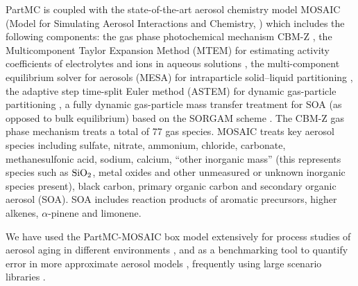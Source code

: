 \documentclass[11pt]{article}
\begin{document}
PartMC is coupled with the state-of-the-art aerosol chemistry model
MOSAIC (Model for Simulating Aerosol Interactions and Chemistry,
\citep{Zaveri2008}) which includes the following components: the gas
phase photochemical mechanism CBM-Z \citep{Zaveri1999}, the
Multicomponent Taylor Expansion Method (MTEM) for estimating activity
coefficients of electrolytes and ions in aqueous solutions
\citep{Zaveri2005a}, the multi-component equilibrium solver for
aerosols (MESA) for intraparticle solid–liquid partitioning
\citep{Zaveri2005b}, the adaptive step time-split Euler method (ASTEM)
for dynamic gas-particle partitioning \citep{Zaveri2008}, a fully
dynamic gas-particle mass transfer treatment for SOA (as opposed to
bulk equilibrium) based on the SORGAM scheme \citep{Schell2001}. The
CBM-Z gas phase mechanism treats a total of 77 gas species. MOSAIC
treats key aerosol species including sulfate, nitrate, ammonium,
chloride, carbonate, methanesulfonic acid, sodium, calcium, ``other
inorganic mass'' (this represents species such as $\rm SiO_2$, metal
oxides and other unmeasured or unknown inorganic species present),
black carbon, primary organic carbon and secondary organic aerosol
(SOA). SOA includes reaction products of aromatic precursors, higher
alkenes, $\alpha$-pinene and limonene.

We have used the PartMC-MOSAIC box model extensively for process
studies of aerosol aging in different environments
\citep{Fierce2013,Fierce2015,Riemer2010,Tian2014}, and as a
benchmarking tool to quantify error in more approximate aerosol models
\citep{ching2016,Kaiser2014,McGraw2008}, frequently using large
scenario libraries \citep{Fierce2016,Hughes2018}.
\end{document}

